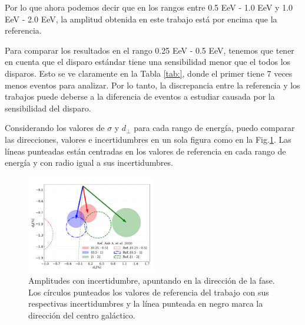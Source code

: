 Por lo que ahora podemos decir que en los rangos entre 0.5 EeV - 1.0 EeV y 1.0 EeV - 2.0 EeV, la amplitud obtenida en este trabajo está por encima que la referencia. 

Para comparar los resultados en el  rango 0.25 EeV - 0.5 EeV, tenemos que tener en cuenta que el disparo estándar tiene una sensibilidad menor que el todos los disparos. Esto se ve claramente en la Tabla \ref{tab:}, donde el primer tiene 7 veces menos eventos para analizar. Por lo tanto, la discrepancia entre la referencia y los trabajos puede deberse a la  diferencia de eventos a estudiar causada por la sensibilidad del disparo.


Considerando los valores de $\sigma$ y $d_\perp$ para cada rango de energía, puedo comparar las direcciones, valores e incertidumbres en un sola figura como en la Fig.\ref{fig:incertidumbre}. Las líneas punteadas están centradas en los valores de referencia en cada rango de energía y con radio igual a sus incertidumbres. 

\begin{figure}[H]
    \begin{small}
        \begin{center}
            \includegraphics[width=0.5\textwidth]{comparando_sigmas_v2.pdf}
        \end{center}
        \caption{Amplitudes con incertidumbre, apuntando en la dirección  de la fase. Los círculos punteados los valores de referencia del trabajo \cite{Aab_2020} con sus respectivas incertidumbres y la línea punteada en negro marca la dirección del centro galáctico.}
        \label{fig:incertidumbre}
    \end{small}
\end{figure}


    
    
    
    
